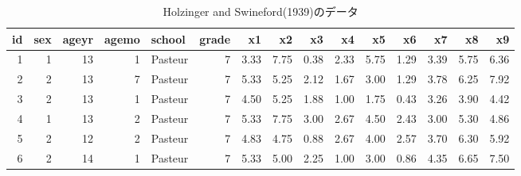 \begin{table}[ht]

	\caption{Holzinger and Swineford(1939)のデータ}
	\centering
	\begin{tabular}[t]{rrrrlrrrrrrrrrr}
		\hline
		id & sex & ageyr & agemo & school  & grade & x1   & x2   & x3   & x4   & x5   & x6   & x7   & x8   & x9   \\
		\hline
		1  & 1   & 13    & 1     & Pasteur & 7     & 3.33 & 7.75 & 0.38 & 2.33 & 5.75 & 1.29 & 3.39 & 5.75 & 6.36 \\
		2  & 2   & 13    & 7     & Pasteur & 7     & 5.33 & 5.25 & 2.12 & 1.67 & 3.00 & 1.29 & 3.78 & 6.25 & 7.92 \\
		3  & 2   & 13    & 1     & Pasteur & 7     & 4.50 & 5.25 & 1.88 & 1.00 & 1.75 & 0.43 & 3.26 & 3.90 & 4.42 \\
		4  & 1   & 13    & 2     & Pasteur & 7     & 5.33 & 7.75 & 3.00 & 2.67 & 4.50 & 2.43 & 3.00 & 5.30 & 4.86 \\
		5  & 2   & 12    & 2     & Pasteur & 7     & 4.83 & 4.75 & 0.88 & 2.67 & 4.00 & 2.57 & 3.70 & 6.30 & 5.92 \\
		6  & 2   & 14    & 1     & Pasteur & 7     & 5.33 & 5.00 & 2.25 & 1.00 & 3.00 & 0.86 & 4.35 & 6.65 & 7.50 \\
		\hline
	\end{tabular}
	\label{tbl::13_01}
\end{table}
